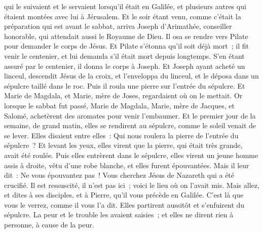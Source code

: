 \begin{multicols}{2}
qui le suivaient et le servaient lorsqu'il était en Galilée, et plusieurs autres qui étaient montées avec lui à Jérusalem.
Et le soir étant venu, comme c'était la préparation qui est avant le sabbat,
arriva Joseph d'Arimathée, conseiller honorable, qui attendait aussi le Royaume de Dieu. Il osa se rendre vers Pilate pour demander le corps de Jésus.
Et Pilate s'étonna qu'il soit déjà mort~; il fit venir le centenier, et lui demanda s'il était mort depuis longtemps.
S'en étant assuré par le centenier, il donna le corps à Joseph.
Et Joseph ayant acheté un linceul, descendit Jésus de la croix, et l'enveloppa du linceul, et le déposa dans un sépulcre taillé dans le roc. Puis il roula une pierre sur l'entrée du sépulcre.
Et Marie de Magdala, et Marie, mère de Joses, regardaient où on le mettait.
\VerseOne{}Or lorsque le sabbat fut passé, Marie de Magdala, Marie, mère de Jacques, et Salomé, achetèrent des aromates pour venir l'embaumer.
Et le premier jour de la semaine, de grand matin, elles se rendirent au sépulcre, comme le soleil venait de se lever.
Elles disaient entre elles~: Qui nous roulera la pierre de l'entrée du sépulcre~?
Et levant les yeux, elles virent que la pierre, qui était très grande, avait été roulée.
Puis elles entrèrent dans le sépulcre, elles virent un jeune homme assis à droite, vêtu d'une robe blanche, et elles furent épouvantées.
Mais il leur dit~: Ne vous épouvantez pas~! Vous cherchez Jésus de Nazareth qui a été crucifié. Il est ressuscité, il n'est pas ici~; voici le lieu où on l'avait mis.
Mais allez, et dites à ses disciples, et à Pierre, qu'il vous précède en Galilée. C'est là que vous le verrez, comme il vous l'a dit.
Elles partirent aussitôt et s'enfuirent du sépulcre. La peur et le trouble les avaient saisies~; et elles ne dirent rien à personne, à cause de la peur.

\end{multicols}
